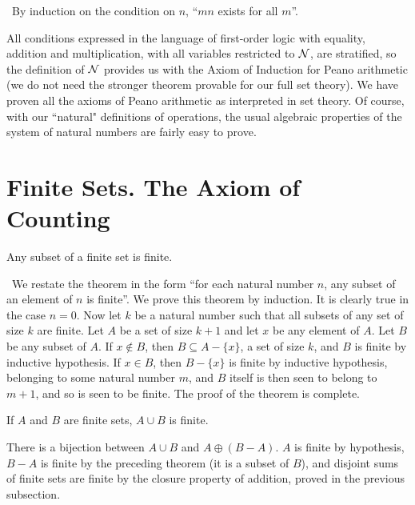 \preuve\ By induction on the condition on $n$,
``$mn$ exists for all $m$''.\linebreak
\mbox{ }\finpreuve

All conditions expressed in the language of first-order logic
with equality, addition and
multiplication, with all variables 
restricted to ${\cal N}$, are stratified, so the
definition of ${\cal N}$ provides us with the Axiom of
Induction for Peano arithmetic (we
do not need the stronger theorem provable for our full set theory).
We have proven all the axioms of Peano arithmetic as interpreted in
set theory.  Of course, with our ``natural" definitions of operations,
the usual algebraic properties of the system of natural numbers are
fairly easy to prove.






\section{Finite Sets. The Axiom of Counting}

\begin{thm}
 Any subset of a finite set is finite.
\end{thm}

\preuve\ We restate the theorem in the form ``for each natural number $n$, any subset of an element of $n$ is finite''.  We prove 
this theorem by induction.  It is clearly true in
the case $n=0$.  Now let $k$ be a natural number such that all subsets of any
set of size $k$ are finite.  Let $A$ be a set of size $k+1$ and let $x$ be any
element of $A$.  Let $B$ be any subset of $A$.  If $x \not\in B$, then
$B \subseteq A-\{x\}$, a set of size $k$, and $B$ is finite by
inductive hypothesis.  If $x\in B$, then $B- \{x\}$ is finite by
inductive hypothesis, belonging to some natural number $m$, and $B$
itself is then seen to belong to $m+1$, and so is seen to be finite.
The proof of the theorem is complete.
\finpreuve

\begin{thm}
 If $A$ and $B$ are finite sets, $A\cup B$ is finite.
\end{thm}

\preuve There is a bijection between $A \cup B$ and $A \oplus
(B-A)$.  $A$ is finite by hypothesis, $B-A$ is finite by the preceding
theorem (it is a subset of $B$), and disjoint sums
of finite sets are finite by the closure property of
addition, proved in the previous
subsection.
\finpreuve

